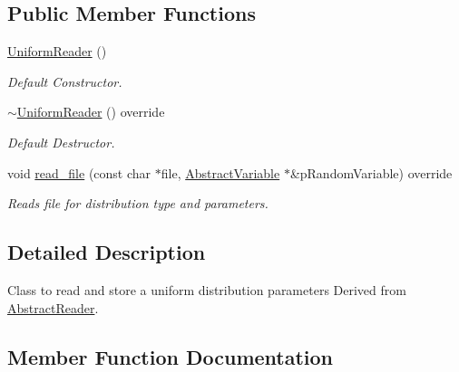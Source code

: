 \subsection*{Public Member Functions}
\begin{DoxyCompactItemize}
\item 
\mbox{\label{classUniformReader_ac6ba86e0db2e3dfe4c5204295c78c5a9}} 
\hyperlink{classUniformReader_ac6ba86e0db2e3dfe4c5204295c78c5a9}{Uniform\+Reader} ()
\begin{DoxyCompactList}\small\item\em Default Constructor. \end{DoxyCompactList}\item 
\mbox{\label{classUniformReader_a4e6558861df3bb2c14670c2b7cd46758}} 
\hyperlink{classUniformReader_a4e6558861df3bb2c14670c2b7cd46758}{$\sim$\+Uniform\+Reader} () override
\begin{DoxyCompactList}\small\item\em Default Destructor. \end{DoxyCompactList}\item 
void \hyperlink{classUniformReader_ae4e326a00cd72cdc1afa73beebe60ddc}{read\+\_\+file} (const char $\ast$file, \hyperlink{classAbstractVariable}{Abstract\+Variable} $\ast$\&p\+Random\+Variable) override
\begin{DoxyCompactList}\small\item\em Reads file for distribution type and parameters. \end{DoxyCompactList}\end{DoxyCompactItemize}


\subsection{Detailed Description}
Class to read and store a uniform distribution parameters Derived from \hyperlink{classAbstractReader}{Abstract\+Reader}. 

\subsection{Member Function Documentation}
\mbox{\label{classUniformReader_ae4e326a00cd72cdc1afa73beebe60ddc}} 
